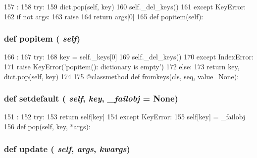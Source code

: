 \begin{DoxyCode}
157                              :
158         try:
159             dict.pop(self, key)
160             self._del_keys()
161         except KeyError:
162             if not args:
163                 raise
164             return args[0]
165 
    def popitem(self):
\end{DoxyCode}
\hypertarget{classm5_1_1util_1_1sorteddict_1_1SortedDict_a4b16fca3b37082f2913c4e6595d85a4f}{
\subsubsection[{popitem}]{\setlength{\rightskip}{0pt plus 5cm}def popitem ( {\em self})}}
\label{classm5_1_1util_1_1sorteddict_1_1SortedDict_a4b16fca3b37082f2913c4e6595d85a4f}



\begin{DoxyCode}
166                      :
167         try:
168             key = self._keys[0]
169             self._del_keys()
170         except IndexError:
171             raise KeyError('popitem(): dictionary is empty')
172         else:
173             return key, dict.pop(self, key)
174 
175     @classmethod
    def fromkeys(cls, seq, value=None):
\end{DoxyCode}
\hypertarget{classm5_1_1util_1_1sorteddict_1_1SortedDict_a1af96fe42a8e8c54a0c606fb4f01df98}{
\subsubsection[{setdefault}]{\setlength{\rightskip}{0pt plus 5cm}def setdefault ( {\em self}, \/   {\em key}, \/   {\em \_\-failobj} = {\ttfamily None})}}
\label{classm5_1_1util_1_1sorteddict_1_1SortedDict_a1af96fe42a8e8c54a0c606fb4f01df98}



\begin{DoxyCode}
151                                             :
152         try:
153             return self[key]
154         except KeyError:
155             self[key] = _failobj
156 
    def pop(self, key, *args):
\end{DoxyCode}
\hypertarget{classm5_1_1util_1_1sorteddict_1_1SortedDict_abe52b977c101e59f342489ed18140819}{
\subsubsection[{update}]{\setlength{\rightskip}{0pt plus 5cm}def update ( {\em self}, \/   {\em args}, \/   {\em kwargs})}}
\label{classm5_1_1util_1_1sorteddict_1_1SortedDict_abe52b977c101e59f342489ed18140819}



